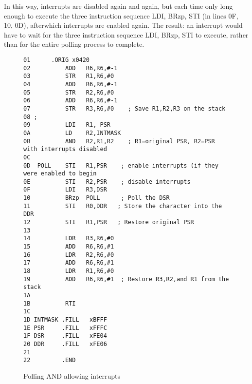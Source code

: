 \documentclass{patt}
\begin{document}
In this way, interrupts are disabled again and again, but each time only  
long enough to execute the three instruction sequence LDI, BRzp, STI
(in lines 0F, 10, 0D), 
afterwhich interrupts are enabled again.  The result: an interrupt would
have to wait for the three instruction sequence LDI, BRzp, STI to execute, 
rather than for the entire polling process to complete.  

\begin{figure}[h]
\begin{Verbatim}[fontsize=\fontsize{9}{11}\selectfont]
01	    .ORIG x0420          
02          ADD   R6,R6,#-1
03          STR   R1,R6,#0
04          ADD   R6,R6,#-1
05          STR   R2,R6,#0
06          ADD   R6,R6,#-1
07          STR   R3,R6,#0    ; Save R1,R2,R3 on the stack 
08 ;         
09          LDI   R1, PSR 
0A          LD    R2,INTMASK
0B          AND   R2,R1,R2    ; R1=original PSR, R2=PSR with interrupts disabled
0C 
0D  POLL    STI   R1,PSR    ; enable interrupts (if they were enabled to begin
0E          STI   R2,PSR    ; disable interrupts
0F          LDI   R3,DSR    
10          BRzp  POLL      ; Poll the DSR
11          STI   R0,DDR   ; Store the character into the DDR
12          STI   R1,PSR   ; Restore original PSR
13
14          LDR   R3,R6,#0
15          ADD   R6,R6,#1
16          LDR   R2,R6,#0
17          ADD   R6,R6,#1         
18          LDR   R1,R6,#0      
19          ADD   R6,R6,#1  ; Restore R3,R2,and R1 from the stack
1A  
1B          RTI          
1C          
1D INTMASK .FILL   xBFFF
1E PSR     .FILL   xFFFC
1F DSR     .FILL   xFE04
20 DDR     .FILL   xFE06
21 
22         .END
\end{Verbatim}
\FloatBarrier
\caption{Polling AND allowing interrupts}
\label{fig:Lumetta}
\end{figure}

\newpage
\clearpage
\end{document}
